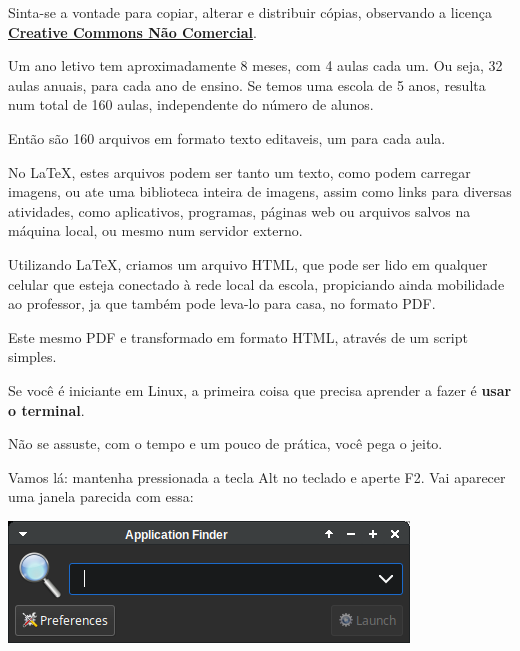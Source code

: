 \begin{multicols}{2}
	Sinta-se a vontade para copiar, alterar e distribuir cópias, observando a licença \href{https://creativecommons.org/licenses/by-nc/3.0/br/deed.pt-br}{\textbf{Creative Commons Não Comercial}}.
	
	Um ano letivo tem aproximadamente 8 meses, com 4 aulas cada um. Ou seja, 32 aulas anuais, para cada ano de ensino. Se temos uma escola de 5 anos, resulta num total de 160 aulas, independente do número de alunos.
	
	Então são 160 arquivos em formato texto editaveis, um para cada aula.
	
	No \LaTeX, estes arquivos podem ser tanto um texto, como podem carregar imagens, ou ate uma biblioteca inteira de imagens, assim como links para diversas atividades, como aplicativos, programas, páginas web ou arquivos salvos na máquina local, ou mesmo num servidor externo.
	
	Utilizando \LaTeX, criamos um arquivo HTML, que pode ser lido em qualquer celular que esteja conectado à rede local da escola, propiciando ainda mobilidade ao professor, ja que também pode leva-lo para casa, no formato PDF.
	
	Este mesmo PDF e transformado em formato HTML, através de um script simples.
	
	
Se você é iniciante em Linux, a primeira coisa que precisa aprender a fazer é \textbf{usar o terminal}.

Não se assuste, com o tempo e um pouco de prática, você pega o jeito.

Vamos lá: mantenha pressionada a tecla Alt no teclado e aperte F2. Vai aparecer uma janela parecida com essa: 

\begin{center}
	\includegraphics[width=\linewidth]{./IMG-GIT/Screenshot_20231222_142820.png}
\end{center}


\end{multicols}
